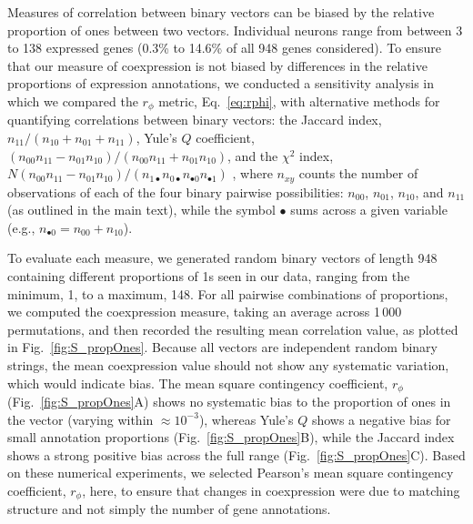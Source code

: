 \documentclass[10pt,letterpaper]{article}
\begin{document}
Measures of correlation between binary vectors can be biased by the relative proportion of ones between two vectors.
Individual neurons range from between 3 to 138 expressed genes (0.3\% to 14.6\% of all 948 genes considered).
To ensure that our measure of coexpression is not biased by differences in the relative proportions of expression annotations, we conducted a sensitivity analysis in which we compared the $r_\phi$ metric, Eq.~\eqref{eq:rphi}, with alternative methods for quantifying correlations between binary vectors: the
Jaccard index, $n_{11}/(n_{10}+n_{01}+n_{11})$,
Yule's $Q$ coefficient, $(n_{00}n_{11} - n_{01}n_{10})/(n_{00}n_{11} + n_{01}n_{10})$,
and the $\chi^2$ index, $N (n_{00}n_{11} - n_{01}n_{10})/(n_{1\bullet}n_{0\bullet}n_{\bullet 0}n_{\bullet 1})$ \cite{Kaufman2006}, where $n_{xy}$ counts the number of observations of each of the four binary pairwise possibilities: $n_{00}$, $n_{01}$, $n_{10}$, and $n_{11}$ (as outlined in the main text), while the symbol $\bullet$ sums across a given variable (e.g., $n_{\bullet 0} = n_{00} + n_{10}$).

To evaluate each measure, we generated random binary vectors of length 948 containing different proportions of 1s seen in our data, ranging from the minimum, 1, to a maximum, 148.
For all pairwise combinations of proportions, we computed the coexpression measure, taking an average across 1\,000 permutations, and then recorded the resulting mean correlation value, as plotted in Fig.~\ref{fig:S_propOnes}.
Because all vectors are independent random binary strings, the mean coexpression value should not show any systematic variation, which would indicate bias.
The mean square contingency coefficient, $r_\phi$ (Fig.~\ref{fig:S_propOnes}A) shows no systematic bias to the proportion of ones in the vector (varying within $\approx 10^{-3}$), whereas Yule's $Q$ shows a negative bias for small annotation proportions (Fig.~\ref{fig:S_propOnes}B), while the Jaccard index shows a strong positive bias across the full range (Fig.~\ref{fig:S_propOnes}C).
Based on these numerical experiments, we selected Pearson's mean square contingency coefficient, $r_\phi$, here, to ensure that changes in coexpression were due to matching structure and not simply the number of gene annotations.
\end{document}
